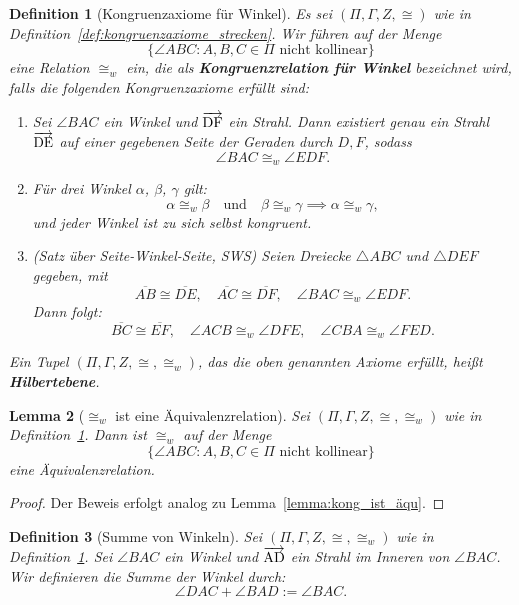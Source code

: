 \documentclass[a4paper,12pt]{article}
\theoremstyle{break}
\newtheorem{definition}{Definition}[section]
\newtheorem{lemma}[definition]{Lemma}
\begin{document}
\begin{definition}[Kongruenzaxiome für Winkel]
\label{def:kongruenzaxiome_winkel}
Es sei \((\Pi, \Gamma, Z, \cong)\) wie in Definition~\ref{def:kongruenzaxiome_strecken}. Wir führen auf der Menge 
\[
\{\angle ABC : A, B, C \in \Pi \text{ nicht kollinear}\}
\]
eine Relation \(\cong_w\) ein, die als \textbf{Kongruenzrelation für Winkel} bezeichnet wird, falls die folgenden Kongruenzaxiome erfüllt sind:
\begin{enumerate}
    \item[\textbf{(K4)}]
    Sei \(\angle BAC\) ein Winkel und \(\overrightarrow{\rm DF}\) ein Strahl. Dann existiert genau ein Strahl \(\overrightarrow{\rm DE}\) auf einer gegebenen Seite der Geraden durch \(D, F\), sodass 
    \[
    \angle BAC \cong_w \angle EDF.
    \]
    \item[\textbf{(K5)}]
    Für drei Winkel \(\alpha\), \(\beta\), \(\gamma\) gilt:
    \[
    \alpha \cong_w \beta \quad \text{und} \quad \beta \cong_w \gamma \implies \alpha \cong_w \gamma,
    \]
    und jeder Winkel ist zu sich selbst kongruent.
    \item[\textbf{(K6)}]
    (Satz über Seite-Winkel-Seite, SWS) Seien Dreiecke \(\triangle ABC\) und \(\triangle DEF\) gegeben, mit
    \[
    \overline{AB} \cong \overline{DE}, \quad \overline{AC} \cong \overline{DF}, \quad \angle BAC \cong_w \angle EDF.
    \]
    Dann folgt:
    \[
    \overline{BC} \cong \overline{EF}, \quad \angle ACB \cong_w \angle DFE, \quad \angle CBA \cong_w \angle FED.
    \]
\end{enumerate}
Ein Tupel \((\Pi, \Gamma, Z, \cong, \cong_w)\), das die oben genannten Axiome erfüllt, heißt \textbf{Hilbertebene}.
\end{definition}

\begin{lemma}[\(\cong_w\) ist eine Äquivalenzrelation]
\label{lemma:konw_aequivalenz}
Sei \((\Pi, \Gamma, Z, \cong, \cong_w)\) wie in Definition~\ref{def:kongruenzaxiome_winkel}. Dann ist \(\cong_w\) auf der Menge 
\[
\{\angle ABC : A, B, C \in \Pi \text{ nicht kollinear}\}
\]
eine Äquivalenzrelation.
\end{lemma}

\begin{proof}
Der Beweis erfolgt analog zu Lemma~\ref{lemma:kong_ist_äqu}.
\end{proof}

\begin{definition}[Summe von Winkeln]
\label{def:summe_winkel}
Sei \((\Pi, \Gamma, Z, \cong, \cong_w)\) wie in Definition~\ref{def:kongruenzaxiome_winkel}. Sei \(\angle BAC\) ein Winkel und \(\overrightarrow{\rm AD}\) ein Strahl im Inneren von \(\angle BAC\). Wir definieren die Summe der Winkel durch:
\[
\angle DAC + \angle BAD := \angle BAC.
\]
\end{definition}
\end{document}
